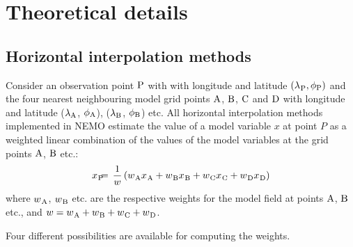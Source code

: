 \documentclass[NEMO_book]{subfiles}
\begin{document}
\section{Theoretical details}
\label{OBS_theory}

\subsection{Horizontal interpolation methods}

Consider an observation point ${\rm P}$ with 
with longitude and latitude $({\lambda_{}}_{\rm P}, \phi_{\rm P})$ and the 
four nearest neighbouring model grid points ${\rm A}$, ${\rm B}$, ${\rm C}$ 
and ${\rm D}$ with longitude and latitude ($\lambda_{\rm A}$, $\phi_{\rm A}$),
($\lambda_{\rm B}$, $\phi_{\rm B}$) etc.
All horizontal interpolation methods implemented in NEMO
estimate the value of a model variable $x$ at point $P$ as
a weighted linear combination of the values of the model 
variables at the grid points ${\rm A}$, ${\rm B}$ etc.:
\begin{eqnarray}
{x_{}}_{\rm P} & \hspace{-2mm} = \hspace{-2mm} & 
\frac{1}{w} \left( {w_{}}_{\rm A} {x_{}}_{\rm A} + 
                   {w_{}}_{\rm B} {x_{}}_{\rm B} + 
                   {w_{}}_{\rm C} {x_{}}_{\rm C} + 
                   {w_{}}_{\rm D} {x_{}}_{\rm D} \right)
\end{eqnarray}
where ${w_{}}_{\rm A}$, ${w_{}}_{\rm B}$ etc. are the respective weights for the 
model field at points ${\rm A}$, ${\rm B}$ etc., and 
$w = {w_{}}_{\rm A} + {w_{}}_{\rm B} + {w_{}}_{\rm C} + {w_{}}_{\rm D}$.

Four different possibilities are available for computing the weights.
\end{document}
